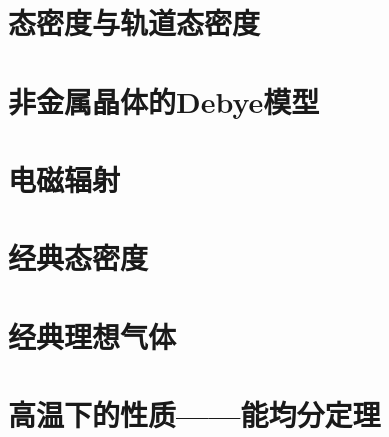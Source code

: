 \section{态密度与轨道态密度}\label{sec16.6}

\section{非金属晶体的Debye模型}\label{sec16.7}

\section{电磁辐射}\label{sec16.8}

\section{经典态密度}\label{sec16.9}

\section{经典理想气体}\label{sec16.10}

\section{高温下的性质——能均分定理}\label{sec16.11}
